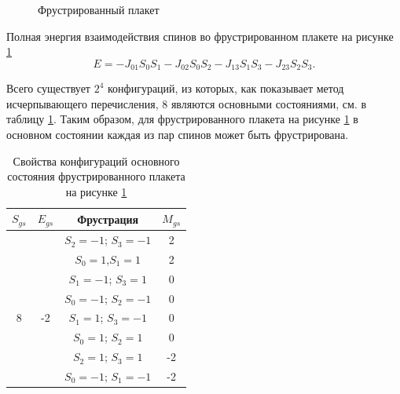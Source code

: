 \documentclass[utf8, babel, sor, jor, amsmath, amssymb, reprint]{elsarticle} %
\begin{document}
\begin{figure}[H]
	\centering
\begin{minipage}{0.3\textwidth}
	\centering
	\caption{Фрустрированный плакет}
	\label{fig:struna}
\end{minipage}
\end{figure}

Полная энергия взаимодействия спинов во фрустрированном плакете на рисунке \ref{fig:struna}
\begin{equation}
	E = -J_{01} S_0 S_1-J_{02} S_0 S_2-J_{13} S_1 S_3-J_{23} S_2 S_3.
	\label{eq:ising_energy_2x2}
\end{equation}

Всего существует $2^4$ конфигураций, из которых, как показывает метод исчерпывающего перечисления, 8 являются основными состояниями, см. в таблицу \ref{tab:Strunags}. Таким образом, для фрустрированного плакета на рисунке \ref{fig:struna} в основном состоянии каждая из пар спинов может быть фрустрирована.

\begin{table}[H]
		\centering
	\begin{tabular}{|c|c|c|c|}
	
		\hline
	 $S_{gs}$	& $E_{gs}$    & Фрустрация  &   $M_{gs}$   \\
	\hline
	    & & 	$S_2=-1$; $S_3=-1$ & 2   \\ 	\cline{3-4}
	   	& & $S_0=1$,$S_1=1$        & 2\\ 	\cline{3-4}
		& &  $S_1=-1$; $S_3=1$     & 0    \\ \cline{3-4} 
        &  & $S_0=-1$; $S_2=-1$ &	0  \\ 
		\cline{3-4} 
		8	\multirow{3}{*}{} & -2 \multirow{3}{*}{} & $S_1=1$;  $S_3=-1$     &  0\\ \cline{3-4}	
		& & $S_0=1$;  $S_2=1$      &  0\\ \cline{3-4}
		& &	$S_2=1$;  $S_3=1$      &  -2\\ \cline{3-4}
		& &	$S_0=-1$; $S_1=-1$     & -2\\ \hline
	
	\end{tabular}
	\caption{Свойства конфигураций основного состояния фрустрированного плакета на рисунке \ref{fig:struna}}
	\label{tab:Strunags}
\end{table}
\end{document}
